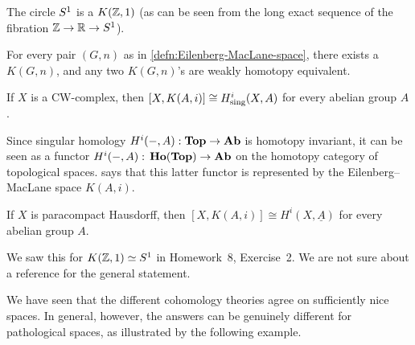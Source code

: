 \begin{exmp}
The circle \(\sphere[1]\) is a \(K(\mathbb{Z},1)\) (as can be seen from the long exact sequence of the fibration \(\bb Z\to\bb R\to\sphere[1]\)).
\end{exmp}

\begin{thm}[name={\cite[Proposition~4.30]{hatcherAlgebraicTopology2002}}]
For every pair \((G,n)\) as in \cref{defn:Eilenberg-MacLane-space}, there exists a \(K(G,n)\), and any two \(K(G,n)\)'s are weakly homotopy equivalent.
\end{thm}

\begin{prop}[name={representability of singular cohomology~\cite[Theorem 4.57]{hatcherAlgebraicTopology2002}}]\label{prop:representability-of-singular-cohomology}
If \(X\) is a CW-complex, then \([X,K(A,i)]\cong H^i_{\smash{\textup{sing}}}(X,A)\) for every abelian group \(A\).
\end{prop}

\begin{rmk}
Since singular homology \(H^i(-,A)\colon\catTopologicalSpace\to\catAbelianGroup\) is homotopy invariant, it can be seen as a functor \(H^i(-,A)\colon\catHomotopy(\catTopologicalSpace)\to\catAbelianGroup\) on the homotopy category of topological spaces.
 says that this latter functor is represented by the Eilenberg--MacLane space \(K(A,i)\).
\end{rmk}

\begin{prop}\label{prop:comparison-sheaf-cohomology-Eilenberg-MacLane}
If \(X\) is paracompact Hausdorff, then \([X,K(A,i)]\cong H^i(X,\underline{A})\) for every abelian group \(A\).
\end{prop}
We saw this for \(K(\bb Z,1)\simeq\sphere[1]\) in Homework~8, Exercise~2.
We are not sure about a reference for the general statement.

We have seen that the different cohomology theories agree on sufficiently nice spaces.
In general, however, the answers can be genuinely different for pathological spaces, as illustrated by the following example.

